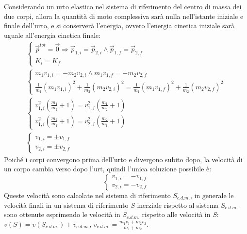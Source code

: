 \documentclass{article}
\numberwithin{equation}{subsection}
\begin{document}
Considerando un urto elastico nel sistema di riferimento del 
centro di massa dei due corpi, allora la quantità di moto 
complessiva sarà nulla nell'istante iniziale e finale dell'urto, e si conserverà l'energia, 
ovvero l'energia cinetica iniziale sarà uguale all'energia 
cinetica finale:
\begin{gather}
    \begin{cases}
        \vec{p}^{tot}=\vec{0}\Rightarrow \vec{p}_{1,i}=\vec{p}_{2,i}\land\vec{p}_{1,f}=\vec{p}_{2,f}\\
        K_i=K_f
    \end{cases}\\
    \begin{cases}
        m_1v_{1,i}=-m_2v_{2,i}\land m_1v_{1,f}=-m_2v_{2,f}\\
        \displaystyle\frac{1}{m_1}(m_1v_{1,i})^2+\frac{1}{m_2}(m_2v_{2,i})^2=\frac{1}{m_1}(m_1v_{1,f})^2+\frac{1}{m_2}(m_2v_{2,f})^2
    \end{cases}\\
    \begin{cases}
        \displaystyle v_{1,i}^2\left(\displaystyle\frac{m_1}{m_2}+1\right)=v_{1,f}^2\left(\displaystyle\frac{m_1}{m_2}+1\right)\\
        \displaystyle v_{1,i}^2\left(\displaystyle\frac{m_2}{m_1}+1\right)=v_{2,f}^2\left(\displaystyle\frac{m_2}{m_1}+1\right)
    \end{cases}\\
    \begin{cases}
        v_{1,i}=\pm v_{1,f}\\
        v_{2,i}=\pm v_{2,f}
    \end{cases}     
\end{gather}
Poiché i corpi convergono prima dell'urto e divergono subito 
dopo, la velocità di un corpo cambia verso dopo l'urt, quindi 
l'unica soluzione possibile è:
\begin{equation}
    \begin{cases}
        v_{1,i}=-v_{1,f}\\
        v_{2,i}=-v_{2,f}
    \end{cases}
\end{equation}
Queste velocità sono calcolate nel sistema di riferimento $S_{c.d.m.}$, 
in generale le velocità finali in un sistema di riferimento $S$
inerziale rispetto al sistema $S_{c.d.m.}$ sono ottenute 
esprimendo le velocità in $S_{c.d.m.}$ rispetto alle 
velocità in $S$: $v(S)=v(S_{c.d.m.})+v_{c.d.m.}$, $v_{c.d.m.}=\displaystyle\frac{m_1v_1+m_2v_2}{m_1+m_2}$. 
\end{document}
